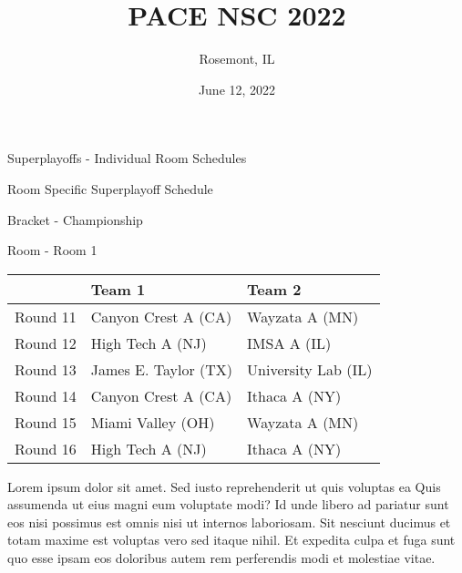 \documentclass{article}%
\title{PACE NSC 2022}%
\author{Rosemont, IL}%
\date{June 12, 2022}%
\begin{document}
%
\normalsize%
%
\maketitle%
\vspace*{48pt}%
\begin{center}%
\begin{Huge}%
Superplayoffs {-} Individual Room Schedules%
\end{Huge}%
\end{center}%
\newpage%
\pagestyle{fancy}%
\fancyhf{}%
%
%
%
\begin{center}%
\begin{Huge}%
Room Specific Superplayoff Schedule%
\end{Huge}%
\vspace*{8pt}%
\linebreak%
\begin{Large}%
Bracket {-} Championship%
\end{Large}%
\vspace*{8pt}%
\linebreak%
\vspace*{8pt}%
\begin{Large}%
Room {-} Room 1%
\end{Large}%
\end{center}%
%
\begin{tabularx}{\textwidth}{|c|Y|Y|}%
\hline%
&Team 1&Team 2\\%
\hline%
Round 11&Canyon Crest A (CA)&Wayzata A (MN)\\%
Round 12&High Tech A (NJ)&IMSA A (IL)\\%
Round 13&James E. Taylor (TX)&University Lab (IL)\\%
Round 14&Canyon Crest A (CA)&Ithaca A (NY)\\%
Round 15&Miami Valley (OH)&Wayzata A (MN)\\%
Round 16&High Tech A (NJ)&Ithaca A (NY)\\%
\hline%
\end{tabularx}%
\vspace*{8pt}%
\newline%
    Lorem ipsum dolor sit amet. Sed iusto reprehenderit ut quis voluptas ea Quis assumenda ut eius magni eum voluptate modi? Id unde libero ad pariatur sunt eos nisi possimus est omnis nisi ut internos laboriosam. Sit nesciunt ducimus et totam maxime est voluptas vero sed itaque nihil. Et expedita culpa et fuga sunt quo esse ipsam eos doloribus autem rem perferendis modi et molestiae vitae.\newline%
\end{document}
